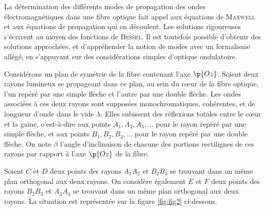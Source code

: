 \documentclass[a4paper,french,bookmarks]{article}
\begin{document}
    La détermination des différents modes de propagation des ondes électromagnétiques dans une fibre optique fait appel aux équations de \textsc{Maxwell} et aux équations de propagation qui en découlent. Les solutions rigoureuses s'écrivent au moyen des fonctions de \textsc{Bessel}. Il est toutefois possible d'obtenir des solutions approchées, et d'appréhender la notion de modes avec un formalisme allégé, en s'appuyant sur des considérations simples d'optique ondulatoire.\medskip
    
    Considérons un plan de symétrie de la fibre contenant l'axe $\p{Oz}$. Soient deux rayons lumineux se propageant dans ce plan, au sein du c\oe{}ur de la fibre optique, l'un repéré par une simple flèche et l'autre par une double flèche. Les ondes associées à ces deux rayons sont supposées monochromatiques, cohérentes, et de longueur d'onde dans le vide $\lambda$. Elles subissent des réflexions totales entre le c\oe{}ur et la gaine, c'est-à-dire aux points $A_1, A_2, A_3, \dots$ pour le rayon repéré par une simple flèche, et aux points $B_1, B_2, B_3, \dots$ pour le rayon repéré par une double flèche. On note $\beta$ l'angle d'inclinaison de chacune des portions rectilignes de ces rayons par rapport à l'axe $\p{Oz}$ de la fibre.\medskip
    
    Soient $C$ et $D$ deux points des rayons $A_1A_2$ et $B_2B_3$ se trouvant dans un même plan orthogonal aux deux rayons. On considère également $E$ et $F$ deux points des rayons $B_2B_3$ et $A_3A_4$ se trouvant dans un même plan orthogonal aux deux rayons. La situation est représentée sur la figure \ref{fig:fig2} ci-dessous.
    
    \begin{center}
        \begin{minipage}{0.8\linewidth}
            \centering
        \end{minipage}
        \text{}\\[2pt]
        \begin{minipage}{0.9\linewidth}
	        \label{fig:fig2}
        \end{minipage}
    \end{center}
    
\end{document}
